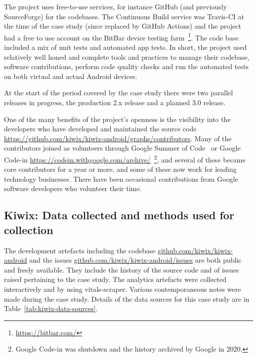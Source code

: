 The project uses free-to-use services, for instance GitHub (and previously SourceForge) for the codebases. The Continuous Build service was Travis-CI at the time of the case study (since replaced by GitHub Actions) and the project had a free to use account on the BitBar device testing farm~\footnote{\url{https://bitbar.com/}}. The code base included a mix of unit tests and automated app tests. In short, the project used relatively well honed and complete tools and practices to manage their codebase, software contributions, perform code quality checks and run the automated tests on both virtual and actual Android devices.

At the start of the period covered by the case study there were two parallel releases in progress, the production 2.x release and a planned 3.0 release.

One of the many benefits of the project’s openness is the visibility into the developers who have developed and maintained the source code \url{https://github.com/kiwix/kiwix-android/graphs/contributors}. Many of the contributors joined as volunteers through Google Summer of Code~ or Google Code-in \url{https://codein.withgoogle.com/archive/}~\footnote{Google Code-in was shutdown and the history archived by Google in 2020.}, and several of these became core contributors for a year or more, and some of these now work for leading technology businesses. There have been occasional contributions from Google software developers who volunteer their time.

\subsection{Kiwix: Data collected and methods used for collection}
The development artefacts including the codebase \href{https://github.com/kiwix/kiwix-android}{github.com/kiwix/kiwix-android} and the issues \href{https://github.com/kiwix/kiwix-android/issues}{github.com/kiwix/kiwix-android/issues} are both public and freely available. They include the history of the source code and of issues raised pertaining to the case study. The analytics artefacts were collected interactively and by using vitals-scraper. Various contemporaneous notes were made during the case study.  Details of the data sources for this case study are in Table~\ref{tab:kiwix-data-sources}.

